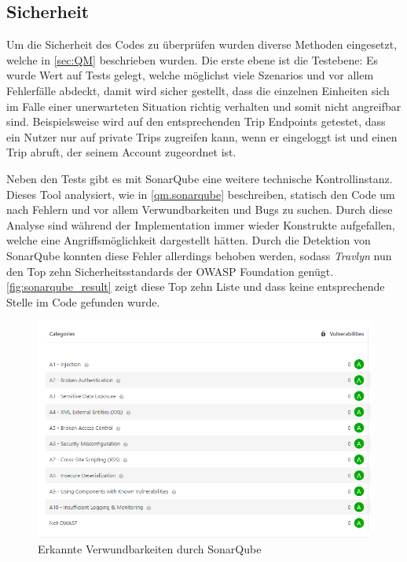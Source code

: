 	\subsection{Sicherheit}
	Um die Sicherheit des Codes zu überprüfen wurden diverse Methoden eingesetzt, welche in \autoref{sec:QM} beschrieben wurden. Die erste ebene ist die Testebene: Es wurde Wert auf Tests gelegt, welche möglichst viele Szenarios und vor allem Fehlerfälle abdeckt, damit wird sicher gestellt, dass die einzelnen Einheiten sich im Falle einer unerwarteten Situation richtig verhalten und somit nicht angreifbar sind. Beispielsweise wird auf den entsprechenden Trip Endpoints getestet, dass ein Nutzer nur auf private Trips zugreifen kann, wenn er eingeloggt ist und einen Trip abruft, der seinem Account zugeordnet ist.
	
	\vspace{0.25cm}
	
	Neben den Tests gibt es mit SonarQube eine weitere technische Kontrollinstanz. Dieses Tool analysiert, wie in \autoref{qm.sonarqube} beschreiben, statisch den Code um nach Fehlern und vor allem Verwundbarkeiten und Bugs zu suchen. Durch diese Analyse sind während der Implementation immer wieder Konstrukte aufgefallen, welche eine Angriffsmöglichkeit dargestellt hätten. Durch die Detektion von SonarQube konnten diese Fehler allerdings behoben werden, sodass \textit{Travlyn} nun den Top zehn Sicherheitsstandards der OWASP Foundation \cite{OWASPFoundation.20200503T01:28:27.000Z} genügt. \autoref{fig:sonarqube_result} zeigt diese Top zehn Liste und dass keine entsprechende Stelle im Code gefunden wurde.
	
	\begin{figure}[ht!]
		\centering
		\includegraphics[width=1\textwidth]{images/Verwundbarkeiten_SonarQube.png}
		\caption{Erkannte Verwundbarkeiten durch SonarQube}
		\label{fig:sonarqube_result}
	\end{figure}

